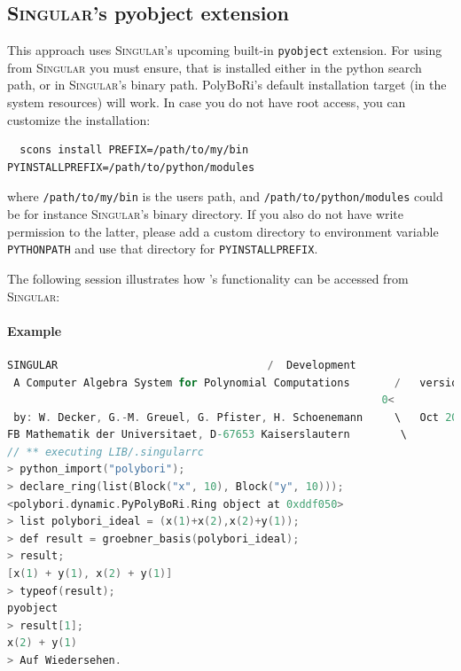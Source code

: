 \subsection{\textsc{Singular}'s pyobject extension}

This approach uses \textsc{Singular}'s upcoming built-in \texttt{pyobject}
extension. For using \PolyBoRi from \textsc{Singular} you must ensure, 
that \PolyBoRi is installed either in the python 
search path, or in \textsc{Singular}'s binary path. PolyBoRi's default installation
target (in the system resources) will work. In case you do not have root access,
you can customize the installation:

\begin{lstlisting}
  scons install PREFIX=/path/to/my/bin PYINSTALLPREFIX=/path/to/python/modules
\end{lstlisting}

where \texttt{/path/to/my/bin} is the users path, and \texttt{/path/to/python/modules}
could be for instance \textsc{Singular}'s binary directory. If you also do not have write
permission to the latter, please add a custom directory to environment
variable \texttt{PYTHONPATH} and use that directory for \texttt{PYINSTALLPREFIX}.

The following session illustrates how \PolyBoRi's functionality can be accessed
from \textsc{Singular}:

\paragraph{Example}
\begin{lstlisting}[language=C]
                     SINGULAR                                 /  Development
 A Computer Algebra System for Polynomial Computations       /   version 3-1-2
                                                           0<
 by: W. Decker, G.-M. Greuel, G. Pfister, H. Schoenemann     \   Oct 2010
FB Mathematik der Universitaet, D-67653 Kaiserslautern        \
// ** executing LIB/.singularrc
> python_import("polybori");
> declare_ring(list(Block("x", 10), Block("y", 10)));
<polybori.dynamic.PyPolyBoRi.Ring object at 0xddf050>
> list polybori_ideal = (x(1)+x(2),x(2)+y(1));
> def result = groebner_basis(polybori_ideal);
> result;
[x(1) + y(1), x(2) + y(1)]
> typeof(result);
pyobject
> result[1];
x(2) + y(1)
> Auf Wiedersehen.
\end{lstlisting}


